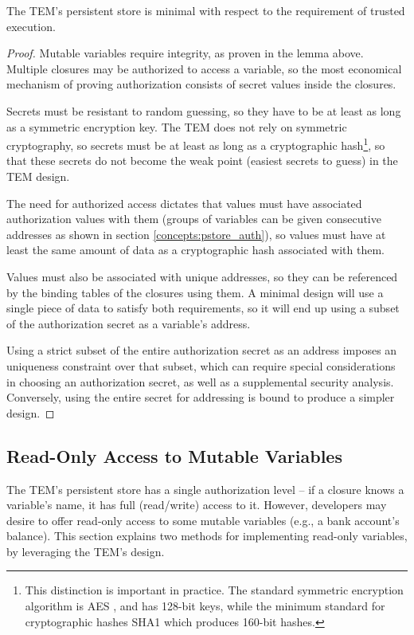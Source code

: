 \begin{theorem*}
The TEM's persistent store is minimal with respect to the requirement of
trusted execution.
\end{theorem*}
\begin{proof}
Mutable variables require integrity, as proven in the lemma above. Multiple
closures may be authorized to access a variable, so the most economical
mechanism of proving authorization consists of secret values inside the
closures.

Secrets must be resistant to random guessing, so they have to be at
least as long as a symmetric encryption key. The TEM does not rely on symmetric
cryptography, so secrets must be at least as long as a cryptographic
hash\footnote{This distinction is important in practice. The standard
symmetric encryption algorithm is AES \cite{daemen1999apr}, and has 128-bit
keys, while the minimum standard for cryptographic hashes SHA1
\cite{eastlake2001rus} which produces 160-bit hashes. }, so that these secrets
do not become the weak point (easiest secrets to guess) in the TEM design. 

The need for authorized access dictates that values must have associated
authorization values with them (groups of variables can be given consecutive
addresses as shown in section \ref{concepts:pstore_auth}), so values must have
at least the same amount of data as a cryptographic hash associated with them.

Values must also be associated with unique addresses, so they can be referenced
by the binding tables of the closures using them. A minimal design will use a
single piece of data to satisfy both requirements, so it will end up using a
subset of the authorization secret as a variable's address.

Using a strict subset of the entire authorization secret as an address imposes
an uniqueness constraint over that subset, which can require special considerations
in choosing an authorization secret, as well as a supplemental security
analysis. Conversely, using the entire secret for addressing is bound to
produce a simpler design.
\end{proof}

\subsection{Read-Only Access to Mutable Variables}
The TEM's persistent store has a single authorization level -- if a closure
knows a variable's name, it has full (read/write) access to it. However,
developers may desire to offer read-only access to some mutable variables (e.g.,
a bank account's balance). This section explains two methods for implementing
read-only variables, by leveraging the TEM's design.

